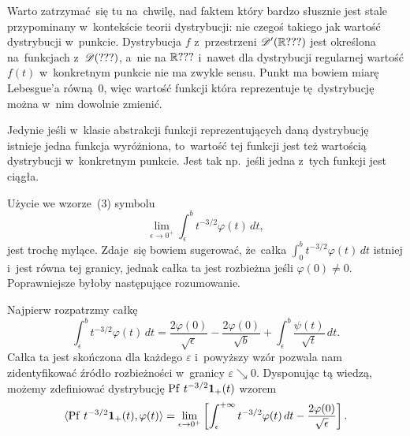 \documentclass[a4paper,11pt]{article}
\begin{document}
\noindent
{} Warto zatrzymać~się tu na~chwilę, nad faktem który
bardzo słusznie jest stale przypominany w~kontekście teorii
dystrybucji: nie czegoś takiego jak wartość dystrybucji w~punkcie.
Dystrybucja $f$ z~przestrzeni $\mathcal{D}'( \mathbb{R} ??? )$ jest określona
na~funkcjach z~$\mathcal{D}( ??? )$, a~nie na $\mathbb{R} ???$ i~nawet dla dystrybucji
regularnej wartość $f( t )$ w~konkretnym punkcie nie ma zwykle sensu.
Punkt ma bowiem miarę Lebesgue’a równą~0, więc wartość funkcji która
reprezentuje tę~dystrybucję można w~nim dowolnie zmienić.

Jedynie jeśli w~klasie abstrakcji funkcji reprezentujących daną
dystrybucję istnieje jedna funkcja wyróżniona, to~wartość tej funkcji
jest też wartością dystrybucji w~konkretnym punkcie. Jest tak
np.~jeśli jedna z~tych funkcji jest ciągła.

\VerSpaceFour





\noindent
{} Użycie we wzorze~(3) symbolu
\begin{equation}
  \label{eq:Zemanian-01}
  \lim_{ \epsilon \to 0^{ + } } \int_{ \epsilon }^{ b } t^{ -3 / 2 } \varphi( t ) \, dt,
\end{equation}
jest trochę mylące. Zdaje~się bowiem sugerować, że~całka
$\int_{ 0 }^{ b } t^{ -3 / 2 } \varphi( t ) \, dt$ istniej i~jest równa tej
granicy, jednak całka ta jest rozbieżna jeśli $\varphi( 0 ) \neq 0$.
Poprawniejsze byłoby następujące rozumowanie.

Najpierw rozpatrzmy całkę
\begin{equation}
  \label{eq:Zemanian-02}
  \int_{ \epsilon }^{ b } t^{ -3/2 } \varphi( t ) \, dt =
  \frac{ 2 \varphi( 0 ) }{ \sqrt{ \epsilon } } - \frac{ 2 \varphi( 0 ) }{ \sqrt{ b } }
  + \int_{ \epsilon }^{ b } \frac{ \psi( t ) }{ \sqrt{ t } } \, dt.
\end{equation}
Całka ta jest skończona dla każdego $\varepsilon$ i~powyższy wzór pozwala
nam zidentyfikować źródło rozbieżności w~granicy $\varepsilon \searrow 0$.
Dysponując tą wiedzą, możemy zdefiniować dystrybucję
$\mathrm{Pf}\, \, t^{ -3 / 2 } \mathbf{1}_{ + }( t )$ wzorem
\begin{equation}
  \label{eq:Zemanian-03}
  \langle \mathrm{Pf}\, \, t^{ -3/2 } \mathbf{1}_{ + }( t ), \varphi( t ) \rangle =
  \lim_{ \epsilon \to 0^{ + } } \left[ \int_{ \epsilon }^{ +\infty } t^{ -3/2 } \varphi( t ) \, dt
    - \frac{ 2 \varphi( 0 ) }{ \sqrt{ \epsilon } } \right].
\end{equation}
\end{document}
